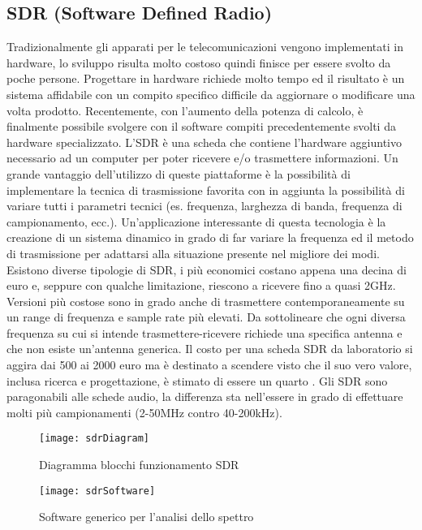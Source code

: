 \begin{itemize}
\chapter{SDR (Software Defined Radio)} Tradizionalmente gli apparati per le telecomunicazioni vengono implementati in hardware, lo sviluppo risulta molto costoso quindi finisce per essere svolto da poche persone. Progettare in hardware richiede molto tempo ed il risultato è un sistema affidabile con un compito specifico difficile da aggiornare o modificare una volta prodotto. Recentemente, con l'aumento della potenza di calcolo, è finalmente possibile svolgere con il software compiti precedentemente svolti da hardware specializzato. L'SDR è una scheda che contiene l'hardware aggiuntivo necessario ad un computer per poter ricevere e/o trasmettere informazioni. Un grande vantaggio dell'utilizzo di queste piattaforme è la possibilità di implementare la tecnica di trasmissione favorita con in aggiunta la possibilità di variare tutti i parametri tecnici (es. frequenza, larghezza di banda, frequenza di campionamento, ecc.). Un'applicazione interessante di questa tecnologia è la creazione di un sistema dinamico in grado di far variare la frequenza ed il metodo di trasmissione per adattarsi alla situazione presente nel migliore dei modi. Esistono diverse tipologie di SDR, i più economici costano appena una decina di euro e, seppure con qualche limitazione, riescono a ricevere fino a quasi 2GHz. Versioni più costose sono in grado anche di trasmettere contemporaneamente su un range di frequenza e sample rate più elevati. Da sottolineare che ogni diversa frequenza su cui si intende trasmettere-ricevere richiede una specifica antenna e che non esiste un'antenna generica.
Il costo per una scheda SDR da laboratorio si aggira dai 500 ai 2000 euro ma è destinato a scendere visto che il suo vero valore, inclusa ricerca e progettazione, è stimato di essere un quarto \cite{SdrDrugs}.
Gli SDR sono paragonabili alle schede audio, la differenza sta nell'essere in grado di effettuare molti più campionamenti (2-50MHz contro 40-200kHz).
\begin{figure}[h]
	\centering
	\begin{minipage}[b]{.5\columnwidth}
		\texttt{[image: sdrDiagram]}
		\caption{Diagramma blocchi funzionamento SDR \cite{sdrDiagram}}\label{fig:1}
	\end{minipage}\hfill
	\begin{minipage}[b]{.4\columnwidth}
		\texttt{[image: sdrSoftware]}
		\caption{Software generico per l'analisi dello spettro \cite{sdrSoftware}}\label{fig:1}

\end{minipage}
\end{figure}
\end{itemize}
